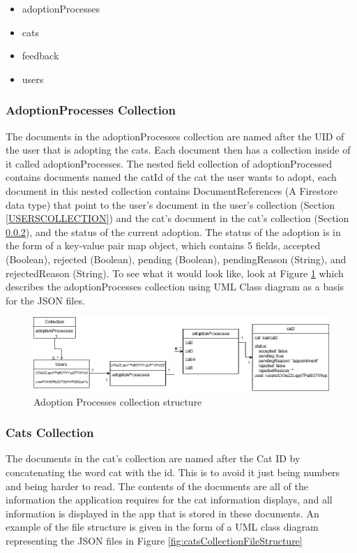     \begin{itemize}
        \item adoptionProcesses
        \item cats
        \item feedback
        \item users
    \end{itemize}
    
    \subsubsection{AdoptionProcesses Collection}
    The documents in the adoptionProcesses collection are named after the UID of the user that is adopting the cats. Each document then has a collection inside of it called adoptionProcesses. The nested field collection of adoptionProcessed contains documents named the catId of the cat the user wants to adopt, each document in this nested collection contains DocumentReferences (A Firestore data type) that point to the user's document in the user's collection (Section \ref{USERSCOLLECTION}) and the cat's document in the cat's collection (Section \ref{CATSCOLLECTION}), and the status of the current adoption. The status of the adoption is in the form of a key-value pair map object, which contains 5 fields, accepted (Boolean), rejected (Boolean), pending (Boolean), pendingReason (String), and rejectedReason (String). To see what it would look like, look at Figure \ref{fig:adoptionProcessFileStructure} which describes the adoptionProcesses collection using UML Class diagram as a basis for the JSON files.
    
\begin{figure} [htbp!]
    \centering
    \includegraphics[width=\textwidth]{Images/adoptionProcesses file relations.png}
    \caption{Adoption Processes collection structure}
    \label{fig:adoptionProcessFileStructure}
\end{figure}

    
    \subsubsection{Cats Collection} \label{CATSCOLLECTION}
    The documents in the cat's collection are named after the Cat ID by concatenating the word cat with the id. This is to avoid it just being numbers and being harder to read. The contents of the documents are all of the information the application requires for the cat information displays, and all information is displayed in the app that is stored in these documents. An example of the file structure is given in the form of a UML class diagram representing the JSON files in Figure \ref{fig:catsCollectionFileStructure}
    
